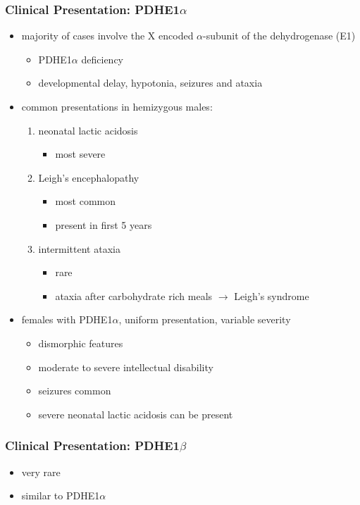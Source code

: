 \documentclass{scrartcl}
\begin{document}
\subsubsection{Clinical Presentation: PDHE1\(\alpha\)}
\label{sec:org1f4aa7f}
\begin{itemize}
\item majority of cases involve the X encoded \(\alpha\)-subunit of the dehydrogenase (E1)
\begin{itemize}
\item PDHE1\(\alpha\) deficiency
\item developmental delay, hypotonia, seizures and ataxia
\end{itemize}

\item common presentations in hemizygous males:
\begin{enumerate}
\item neonatal lactic acidosis
\begin{itemize}
\item most severe
\end{itemize}
\item Leigh's encephalopathy
\begin{itemize}
\item most common
\item present in first 5 years
\end{itemize}
\item intermittent ataxia
\begin{itemize}
\item rare
\item ataxia after carbohydrate rich meals \(\to\) Leigh's syndrome
\end{itemize}
\end{enumerate}

\item females with PDHE1\(\alpha\), uniform presentation, variable severity
\begin{itemize}
\item dismorphic features
\item moderate to severe intellectual disability
\item seizures common
\item severe neonatal lactic acidosis can be present
\end{itemize}
\end{itemize}

\subsubsection{Clinical Presentation: PDHE1\(\beta\)}
\label{sec:org3e84225}
\begin{itemize}
\item very rare
\item similar to PDHE1\(\alpha\)
\end{itemize}
\end{document}
